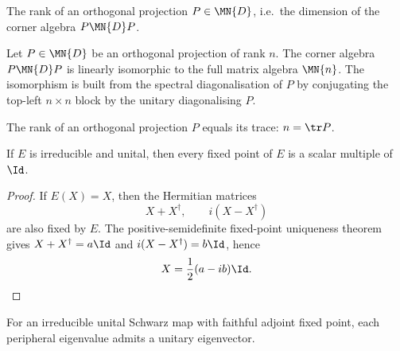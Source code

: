 \begin{definition}
    \leanok
    The rank of an orthogonal projection $P \in \MN{D}$, i.e.\ the
    dimension of the corner algebra $P\MN{D}P$.
\end{definition}

\begin{lemma}%
    \label{thm:compression_isometry_projection}
    \leanok
    Let $P \in \MN{D}$ be an orthogonal projection of rank $n$. The corner
    algebra $P\MN{D}P$ is linearly isomorphic to the full matrix algebra
    $\MN{n}$. The isomorphism is built from the spectral diagonalisation
    of $P$ by conjugating the top-left $n\times n$ block by the unitary
    diagonalising $P$.
\end{lemma}

\begin{lemma}%
    \label{thm:corner_rank_eq_trace}
    \leanok
    The rank of an orthogonal projection $P$ equals its trace: $n = \tr P$.
\end{lemma}

\begin{lemma}
    \label{lem:irreducible_unital_fixed_points_scalar}
    \leanok
    If $E$ is irreducible and unital, then every fixed point of $E$ is a
    scalar multiple of $\Id$.
\end{lemma}

\begin{proof}
    \leanok
    If $E(X)=X$, then the Hermitian matrices
    \[
        X+X^\dagger,
        \qquad
        i(X-X^\dagger)
    \]
    are also fixed by $E$. The positive-semidefinite fixed-point uniqueness
    theorem gives $X+X^\dagger=a\Id$ and
    $i(X-X^\dagger)=b\Id$, hence
    \[
        X=\frac{1}{2}(a-i b)\Id.
    \]
\end{proof}

\begin{lemma}
    \label{lem:peripheral_unitary_eigenvector}
    \leanok
    For an irreducible unital Schwarz map with faithful adjoint fixed point,
    each peripheral eigenvalue admits a unitary eigenvector.
\end{lemma}

